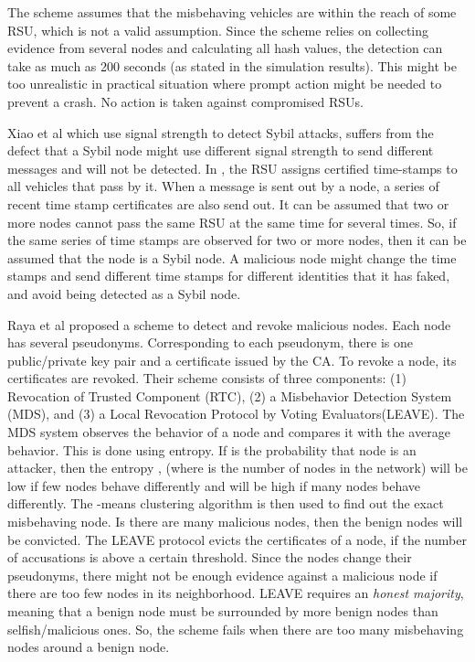 \documentclass[conference]{IEEEtran}[10pt]
\begin{document}
The scheme assumes that the misbehaving vehicles are within the reach of some RSU, which is not a 
valid assumption. Since the scheme relies on collecting evidence from several nodes and calculating all hash values, 
the detection can take as much as 200 seconds (as stated in the simulation results). 
This might be too unrealistic in practical situation where prompt action might be needed to prevent a crash. 
No action is taken against compromised RSUs. 

Xiao et al \cite{XYG06} which use signal strength to detect Sybil attacks, suffers from the defect that a Sybil node might use
different signal strength to send different messages and will not be detected. 
In \cite{PATZ09}, the RSU assigns certified time-stamps to all vehicles that pass by it. 
When a message is sent out by a node, a series of recent time stamp certificates are also send out. 
It can be assumed that  two or more nodes cannot  pass the same RSU at the same time for several times. 
So, if the same series of time stamps are observed for two or more nodes, then it can be assumed
that the node is a Sybil node. 
A malicious node might change the time stamps
and send different time stamps for different identities that it has faked, and avoid being detected as a Sybil node. 

Raya et al \cite{RPAJH07} proposed a scheme to detect and revoke malicious nodes. 
Each node has several pseudonyms. 
Corresponding to each pseudonym, there is one public/private key pair and a certificate issued by the CA. 
To revoke a node, its certificates are revoked. 
Their scheme consists of three components:
(1) Revocation of Trusted Component (RTC), 
(2) a Misbehavior Detection System (MDS), and
(3) a Local Revocation Protocol by Voting Evaluators(LEAVE).
The MDS system observes the behavior of a node and compares it with the average behavior. 
This is done using entropy. If  is the probability that node  is an attacker, then the entropy
, (where  is the number of nodes in the network) will be low if few nodes behave differently and will be high
if many nodes behave differently. 
The -means clustering algorithm \cite{JMF99} is then used to find out the exact misbehaving node. 
Is there are many malicious nodes, then the benign nodes will be convicted. 
The LEAVE protocol evicts the certificates of a node, if the number of accusations is above a certain threshold. 
Since the nodes change their pseudonyms, there might not be enough evidence against a malicious node if there are too few nodes in its neighborhood. 
LEAVE requires an \emph{honest majority}, meaning that a benign node must be surrounded by more benign nodes than selfish/malicious ones. 
So, the scheme fails when there are too many misbehaving nodes around a benign node. 
\end{document}
